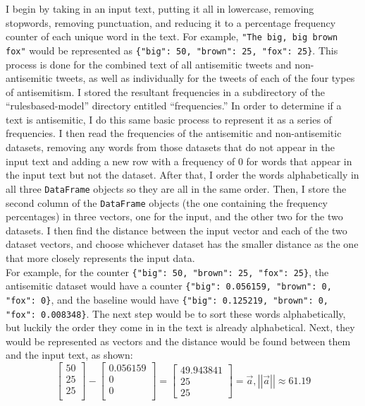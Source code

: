\documentclass{article}
\begin{document}
I begin by taking in an input text, putting it all in lowercase, removing stopwords, removing punctuation, and reducing it to a percentage frequency counter of each unique word in the text. For example, \texttt{"The big, big brown fox"} would be represented as \texttt{\{"big": 50, "brown": 25, "fox": 25\}}. This process is done for the combined text of all antisemitic tweets and non-antisemitic tweets, as well as individually for the tweets of each of the four types of antisemitism. I stored the resultant frequencies in a subdirectory of the ``rulesbased-model'' directory entitled ``frequencies.'' In order to determine if a text is antisemitic, I do this same basic process to represent it as a series of frequencies. I then read the frequencies of the antisemitic and non-antisemitic datasets, removing any words from those datasets that do not appear in the input text and adding a new row with a frequency of 0 for words that appear in the input text but not the dataset. After that, I order the words alphabetically in all three \texttt{DataFrame} objects so they are all in the same order. Then, I store the second column of the \texttt{DataFrame} objects (the one containing the frequency percentages) in three vectors, one for the input, and the other two for the two datasets. I then find the distance between the input vector and each of the two dataset vectors, and choose whichever dataset has the smaller distance as the one that more closely represents the input data.\\

For example, for the counter \texttt{\{"big": 50, "brown": 25, "fox": 25\}}, the antisemitic dataset would have a counter \texttt{\{"big": 0.056159, "brown": 0, "fox": 0\}}, and the baseline would have \texttt{\{"big": 0.125219, "brown": 0, "fox": 0.008348\}}. The next step would be to sort these words alphabetically, but luckily the order they come in in the text is already alphabetical. Next, they would be represented as vectors and the distance would be found between them and the input text, as shown:\\
\[
\left[ {\begin{array}{c}
    50\\
    25\\
    25\\
  \end{array} } \right] - \left[ {\begin{array}{c}
    0.056159\\
    0\\
    0\\
  \end{array} } \right] = \left[ {\begin{array}{c}
    49.943841\\
    25\\
    25\
  \end{array} } \right] = \vec{a} , \left| \left| \vec{a} \right| \right| \approx 61.19
\]
\end{document}
